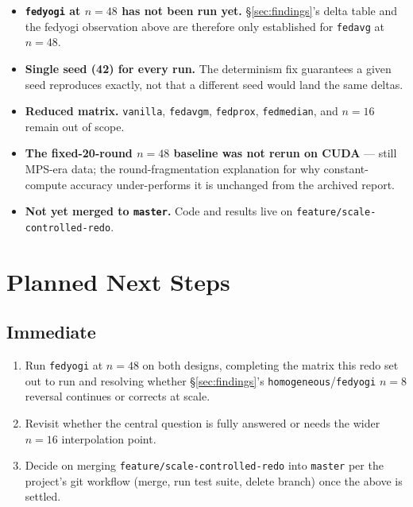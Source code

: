 \documentclass[11pt]{article}
\newcommand{\code}[1]{\texttt{#1}}
\begin{document}
\begin{itemize}[leftmargin=1.4em]
    \item \textbf{\code{fedyogi} at $n{=}48$ has not been run yet.} \S\ref{sec:findings}'s delta
    table and the fedyogi observation above are therefore only established for \code{fedavg} at
    $n{=}48$.
    \item \textbf{Single seed (42) for every run.} The determinism fix guarantees a given seed
    reproduces exactly, not that a different seed would land the same deltas.
    \item \textbf{Reduced matrix.} \code{vanilla}, \code{fedavgm}, \code{fedprox},
    \code{fedmedian}, and $n{=}16$ remain out of scope.
    \item \textbf{The fixed-20-round $n{=}48$ baseline was not rerun on CUDA} --- still MPS-era
    data; the round-fragmentation explanation for why constant-compute accuracy under-performs it
    is unchanged from the archived report.
    \item \textbf{Not yet merged to \code{master}.} Code and results live on
    \code{feature/scale-controlled-redo}.
\end{itemize}

\section{Planned Next Steps}
\label{sec:next}

\subsection{Immediate}
\begin{enumerate}[leftmargin=1.4em]
    \item Run \code{fedyogi} at $n{=}48$ on both designs, completing the matrix this redo set out
    to run and resolving whether \S\ref{sec:findings}'s \code{homogeneous}/\code{fedyogi} $n{=}8$
    reversal continues or corrects at scale.
    \item Revisit whether the central question is fully answered or needs the wider $n{=}16$
    interpolation point.
    \item Decide on merging \code{feature/scale-controlled-redo} into \code{master} per the
    project's git workflow (merge, run test suite, delete branch) once the above is settled.
\end{enumerate}
\end{document}
